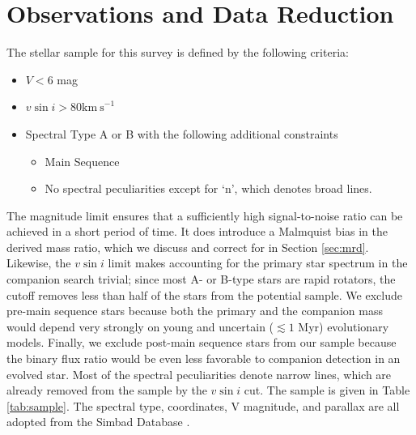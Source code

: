\documentclass{emulateapj}
\begin{document}
\section{Observations and Data Reduction}
\label{sec:obs}

The stellar sample for this survey is defined by the following criteria:

\begin{itemize}
\item $V < 6$ mag
\item $v\sin{i} > 80 \mathrm{km\ s}^{-1}$
\item Spectral Type A or B with the following additional constraints
\begin{itemize}
  \item Main Sequence
  \item No spectral peculiarities except for `n', which denotes broad lines.
\end{itemize}
\end{itemize}

The magnitude limit ensures that a sufficiently high signal-to-noise ratio can be achieved in a short period of time. It does introduce a Malmquist bias in the derived mass ratio, which we discuss and correct for in Section \ref{sec:mrd}. Likewise, the $v\sin{i}$ limit makes accounting for the primary star spectrum in the companion search trivial; since most A- or B-type stars are rapid rotators, the cutoff removes less than half of the stars from the potential sample. We exclude pre-main sequence stars because both the primary and the companion mass would depend very strongly on young and uncertain ($\lesssim 1$ Myr) evolutionary models. Finally, we exclude post-main sequence stars from our sample because the binary flux ratio would be even less favorable to companion detection in an evolved star. Most of the spectral peculiarities denote narrow lines, which are already removed from the sample by the $v\sin{i}$ cut. The sample is given in Table \ref{tab:sample}. The spectral type, coordinates, V magnitude, and parallax are all adopted from the Simbad Database \citep{Simbad}.
\end{document}
